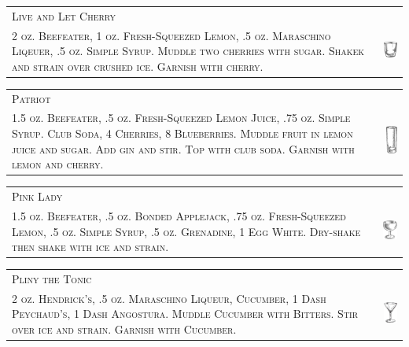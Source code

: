 \documentclass{article}
\begin{document}
\begin{tabular}{b{2.5in} m{0.625in}}
  \multicolumn{2}{p{3.0in}}{\centering\Huge\textsc{Live and Let Cherry}} \\ 
  \textsc{2 oz. Beefeater, 1 oz. Fresh-Squeezed Lemon, .5 oz. Maraschino Liqeuer,
  .5 oz. Simple Syrup. Muddle two cherries with sugar. Shakek and strain over
  crushed ice. Garnish with cherry.} &
  \includegraphics[width=0.5in]{rocks_glass.png}
\end{tabular}

\begin{tabular}{b{2.5in} m{0.625in}}
  \multicolumn{2}{p{3.0in}}{\centering\Huge\textsc{Patriot}} \\ 
  \textsc{1.5 oz. Beefeater, .5 oz. Fresh-Squeezed Lemon Juice, .75 oz.
  Simple Syrup. Club Soda, 4 Cherries, 8 Blueberries. Muddle fruit in lemon juice
  and sugar. Add gin and stir. Top with club soda. Garnish with lemon and cherry.} &
  \includegraphics[width=0.5in]{collins.png}
\end{tabular}

\begin{tabular}{b{2.5in} m{0.625in}}
  \multicolumn{2}{p{3.0in}}{\centering\Huge\textsc{Pink Lady}} \\ 
  \textsc{1.5 oz. Beefeater, .5 oz. Bonded Applejack, .75 oz. Fresh-Squeezed
  Lemon, .5 oz. Simple Syrup, .5 oz. Grenadine, 1 Egg White.
  Dry-shake then shake with ice and strain.} &
  \includegraphics[width=0.5in]{coupe.png}
\end{tabular}

\begin{tabular}{b{2.5in} m{0.625in}}
  \multicolumn{2}{p{3.0in}}{\centering\Huge\textsc{Pliny the Tonic}} \\ 
  \textsc{2 oz. Hendrick's, .5 oz. Maraschino Liqueur, Cucumber, 1 Dash
  Peychaud's, 1 Dash Angostura. Muddle Cucumber with Bitters. Stir
  over ice and strain. Garnish with Cucumber.} &
  \includegraphics[width=0.5in]{goblet.png}
\end{tabular}
\end{document}
